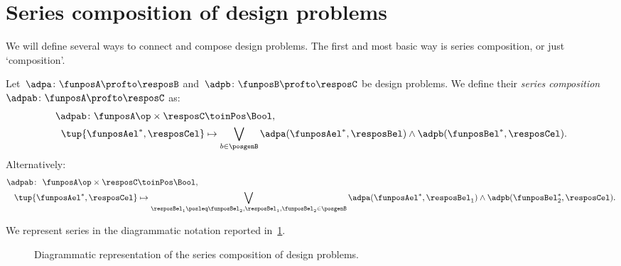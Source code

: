 

\section{Series composition of design problems}
We will define several ways to connect and compose design problems. The first and most basic way is series composition, or just `composition'.

\begin{definition}
    \label{def:dp-series}
    Let~$\adpa \colon  \funposA \profto \resposB$ and~$\adpb \colon \funposB \profto \resposC$ be design problems.
    We define their \emph{series composition}~$\adpab \colon  \funposA \profto \resposC$ as:
    \begin{equation}
        \label{eq:composition2}
        \begin{aligned}
            \adpab
            \colon \funposA\op \times \resposC & \toinPos  \Bool, \\
            \tup{\funposAel^*, \resposCel} &\mapsto \bigvee_{b\in \posgenB} \adpa(\funposAel^*,\resposBel) \wedge \adpb(\funposBel^*,\resposCel).
        \end{aligned}
    \end{equation}
    Alternatively:
    \begin{equation}
        \begin{aligned}
            \label{eq:composition}
            \adpab  \colon \ \funposA\op \times \resposC & \toinPos  \Bool,  \\
            \tup{\funposAel^*, \resposCel} &\mapsto \bigvee_{\resposBel_1\posleq\funposBel_2, \resposBel_1,\funposBel_2\in \posgenB} \adpa(\funposAel^*,\resposBel_1) \wedge \adpb(\funposBel_2^*,\resposCel).
        \end{aligned}
    \end{equation}
\end{definition}
We represent series in the diagrammatic notation reported in~\cref{fig:compositiondiagram}.

\begin{figure}[h!]
    \begin{center}
    \end{center}
    \caption{Diagrammatic representation of the series composition of design problems. \label{fig:compositiondiagram}}
\end{figure}

